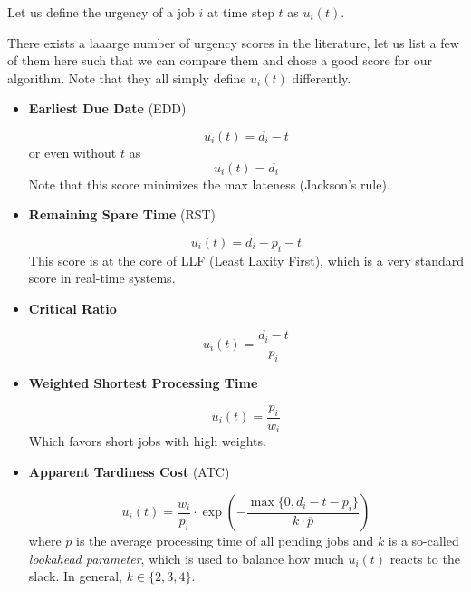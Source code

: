 Let us define the urgency of a job $i$ at time step $t$ as $u_i(t)$.

There exists a laaarge number of urgency scores in the literature, let us list a few of them here such that we can compare them and chose a good score for our algorithm. Note that they all simply define $u_i(t)$ differently.

\begin{itemize}

    \item \textbf{Earliest Due Date} (EDD)

        \begin{equation}
            u_i(t) = d_i - t
        \end{equation}
        or even without $t$ as
        \begin{equation}
            u_i(t) = d_i
        \end{equation}
        Note that this score minimizes the max lateness (Jackson's rule).

    \item \textbf{Remaining Spare Time} (RST)
    
        \begin{equation}
            u_i(t) = d_i - p_i - t
        \end{equation}
        This score is at the core of LLF (Least Laxity First), which is a very standard score in real-time systems.

    \item \textbf{Critical Ratio}
    
        \begin{equation}
            u_i (t) = \frac{d_i - t}{p_i}
        \end{equation}

    \item \textbf{Weighted Shortest Processing Time}
    
        \begin{equation}
            u_i (t) = \frac{p_i}{w_i}
        \end{equation}
        Which favors short jobs with high weights.
    
    \item \textbf{Apparent Tardiness Cost} (ATC)
    
        \begin{equation}
            u_i (t) = \frac{w_i}{p_i} \cdot \exp \left ( - \frac{\max \{0, d_i - t - p_i\}}{k \cdot \overline{p}} \right )
        \end{equation}
        where $\overline{p}$ is the average processing time of all pending jobs and $k$ is a so-called \textit{lookahead parameter}, which is used to balance how much $u_i (t)$ reacts to the slack. In general, $k\in \{2, 3, 4\}$.


\end{itemize}
